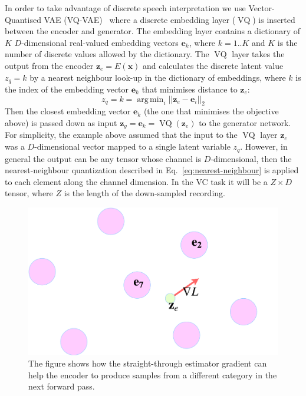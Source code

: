 \documentclass{article}
\DeclareMathOperator*{\argmin}{arg\,min}
\DeclareMathOperator{\VQ}{VQ}
\begin{document}
In order to take advantage of discrete speech interpretation we use Vector-Quantised VAE (VQ-VAE)~\citep{VandenOord2017} where a discrete embedding layer ($\VQ$) is inserted between the encoder and generator.
The embedding layer contains a dictionary of $K$ $D$-dimensional real-valued embedding vectors $\mathbf{e}_k$, where $k = 1..K$ and $K$ is the number of discrete values allowed by the dictionary.
The $\VQ$ layer takes the output from the encoder $\mathbf{z}_e = E({\mathbf{x}})$ and calculates the discrete latent value $z_q=k$ by a nearest neighbour look-up in the dictionary of embeddings, where $k$ is the index of the embedding vector $\mathbf{e}_k$ that minimises distance to $\mathbf{z}_e$:
\begin{equation}
    \label{eq:nearest-neighbour}
    z_q = k = \argmin_i || \mathbf{z}_e - \mathbf{e}_i ||_2
\end{equation}
Then the closest embedding vector $\mathbf{e}_k$ (the one that minimises the objective above) is passed down as input $\mathbf{z}_g = \mathbf{e}_k = \VQ(\mathbf{z}_e)$ to the generator network. For simplicity, the example above assumed that the input to the $\VQ$ layer $\mathbf{z}_e$ was a $D$-dimensional vector mapped to a single latent variable $z_q$. 
However, in general the output can be any tensor whose channel is $D$-dimensional, then the nearest-neighbour quantization described in Eq.~\ref{eq:nearest-neighbour} is applied to each element along the channel dimension.
In the VC task it will be a $Z \times D$ tensor, where $Z$ is the length of the down-sampled recording.

\begin{figure}[tb]
\vskip 5mm
\begin{center}
\centerline{\includegraphics[width=0.8\columnwidth]{report/figures/embedding.pdf}}
\caption{The figure shows how the straight-through estimator gradient can help the encoder to produce samples from a different category in the next forward pass.}
\label{fig:vq-vae-embedding}
\end{center}
\vskip -5mm
\end{figure} 
\end{document}
